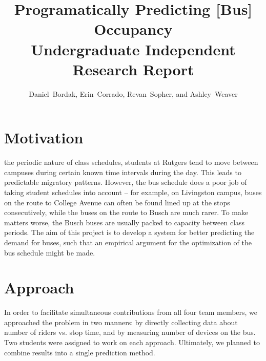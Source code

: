 \documentclass[11pt,journal,compsoc]{IEEEtran} %
\begin{document}
\title{Programatically Predicting [Bus] Occupancy\\
{\large Undergraduate Independent Research Report}}
\author{Daniel~Bordak, Erin~Corrado, Revan~Sopher, and Ashley~Weaver}


\maketitle

\section{Motivation}

the periodic nature of class schedules, students at Rutgers tend to move between campuses during certain known time intervals during the day.
This leads to predictable migratory patterns.
However, the bus schedule does a poor job of taking student schedules into account -- for example, on Livingston campus, buses on the route to College Avenue can often be found lined up at the stops consecutively, while the buses on the route to Busch are much rarer.
To make matters worse, the Busch buses are usually packed to capacity between class periods.
The aim of this project is to develop a system for better predicting the demand for buses, such that an empirical argument for the optimization of the bus schedule might be made.

\section{Approach}

In order to facilitate simultaneous contributions from all four team members, we approached the problem in two manners: by directly collecting data about number of riders vs. stop time, and by measuring number of devices on the bus.
Two students were assigned to work on each approach.
Ultimately, we planned to combine results into a single prediction method.
\end{document}
